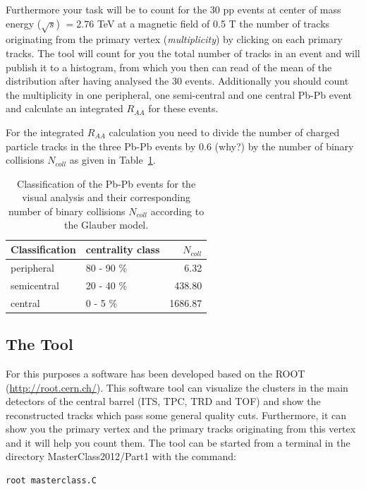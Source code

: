 \documentclass{article}
\begin{document}
Furthermore your task will be to count for the 30 pp events at center of mass 
energy ($\sqrt{s}$) $= 2.76$ TeV at a magnetic field of 0.5 T the number of 
tracks originating from the primary vertex (\textit{multiplicity}) by clicking 
on each primary tracks. The tool will count for you the total number of tracks 
in an event and will publish it to a histogram, from which you then can read 
of the mean of the distribution after having analysed the 30 events. 
Additionally you should count the multiplicity in one peripheral, one 
semi-central and one central Pb-Pb event and calculate an integrated $R_{AA}$ 
for these events.

For the integrated $R_{AA}$ calculation you need to divide the number of
charged particle tracks in the three Pb-Pb events by 0.6 (why?) by the 
number of binary collisions $N_{coll}$ as given in Table~\ref{tab:nCollVisual}.

\begin{table}
  \centering
  \begin{tabular}{llr}
    \toprule
    Classification & centrality class & $N_{coll}$ \\ \midrule
    peripheral 	& 80 - 90 \% & 6.32 \\
    semicentral & 20 - 40 \% & 438.80 \\
    central & 0 - 5 \%	& 1686.87 \\ \bottomrule
  \end{tabular}
  \caption{Classification of the Pb-Pb events for the visual analysis and 
           their corresponding number of binary collisions $N_{coll}$ according 
           to the Glauber model.}
  \label{tab:nCollVisual}
\end{table}

\subsection{The Tool}
For this purposes a software has been developed based on the ROOT  
(\url{http://root.cern.ch/}). This software tool can visualize the clusters 
in the main detectors of the central barrel (ITS, TPC, TRD and TOF) and show 
the reconstructed tracks which pass some general quality cuts. Furthermore, it 
can show you the primary vertex and the primary tracks originating from this 
vertex and it will help you count them. The tool can be started from a terminal
in the directory MasterClass2012/Part1 with the command:

\begin{lstlisting}[]
 	root masterclass.C
\end{lstlisting}
\end{document}
